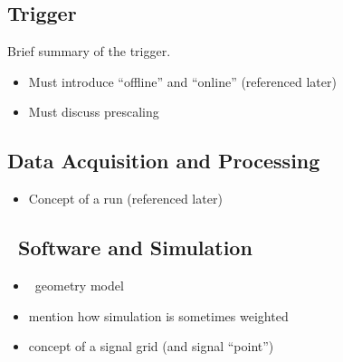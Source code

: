 \subsection{Trigger}
\label{sec:trigger}
Brief summary of the trigger.
\begin{itemize}
\item Must introduce ``offline'' and ``online'' (referenced later)
\item Must discuss prescaling
\end{itemize}
\subsection{Data Acquisition and Processing}
\begin{itemize}
\item Concept of a run (referenced later)
\end{itemize}
\subsection{\atlas\ Software and Simulation}
\label{sec:software}
\begin{itemize}
\item \atlas\ geometry model
\item mention how simulation is sometimes weighted
\item concept of a signal grid (and signal ``point'')
\end{itemize}
